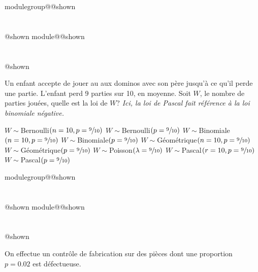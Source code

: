 \documentclass{Evaluation}
\makeatletter
\newcommand{\currentmodulekey}{}
\newcommand{\currentmoduletitle}{}
\newcommand{\currentgroupkey}{}
\newcommand{\currentgrouptitle}{}
\newcommand{\showmoduleifneeded}{%
  \ifx\currentgroupkey\empty\else
    \expandafter\ifx\csname modulegroup@\currentgroupkey @shown\endcsname\relax
      \section*{\currentgrouptitle}%
      \expandafter\gdef\csname modulegroup@\currentgroupkey @shown\endcsname{1}%
    \fi
  \fi
  \expandafter\ifx\csname module@\currentmodulekey @shown\endcsname\relax
    \section*{\currentmoduletitle}%
    \expandafter\gdef\csname module@\currentmodulekey @shown\endcsname{1}%
  \fi
}
\newenvironment{A23}{\showmoduleifneeded}{}
\newenvironment{A25}{\showmoduleifneeded}{}
\makeatother
\begin{document}
\begin{questions}
\begin{A23}
\question {} %
Un enfant accepte de jouer au aux dominos avec son père jusqu'à ce qu'il perde une partie. L'enfant perd 9 parties sur 10, en moyenne. Soit $W$, le nombre de parties jouées, quelle est la loi de $W$? \textit{Ici, la loi de Pascal fait référence à la loi binomiale négative.}

\begin{checkboxes}
    \choice $W\sim$Bernoulli$(n=10, p=\sfrac{9}{10})$
    \choice $W\sim$Bernoulli$(p=\sfrac{9}{10})$
    \choice $W\sim$Binomiale$(n=10, p=\sfrac{9}{10})$
    \choice $W\sim$Binomiale$(p=\sfrac{9}{10})$
    \choice $W\sim$Géométrique$(n=10, p=\sfrac{9}{10})$
    \correctchoice $W\sim$Géométrique$(p=\sfrac{9}{10})$
    \choice $W\sim$Poisson$(\lambda=\sfrac{9}{10})$
    \choice $W\sim$Pascal$(r=10, p=\sfrac{9}{10})$
    \choice $W\sim$Pascal$(p=\sfrac{9}{10})$

\end{checkboxes}
\end{A23}

\begin{A25}
\question {} %
On effectue un contrôle de fabrication sur des pièces dont une proportion $p=0.02$ est défectueuse. 

\end{A25}
\end{questions}
\end{document}
